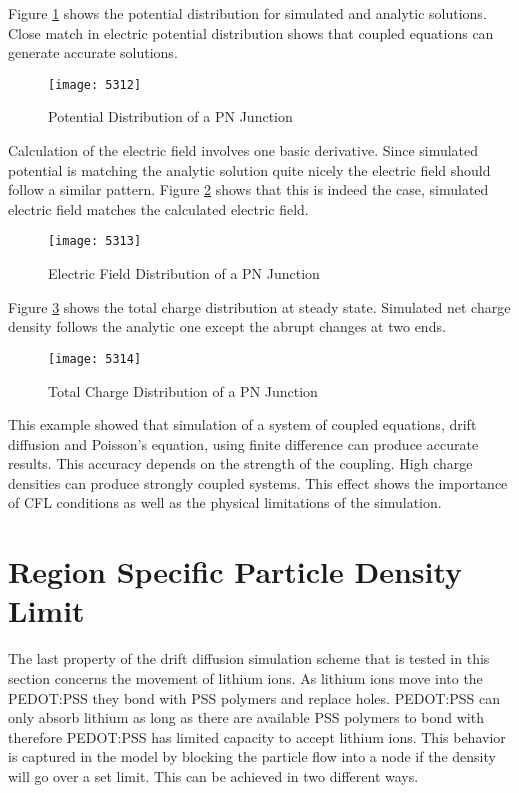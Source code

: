 \begin{doublespace}
 Figure \ref{pnpot} shows the potential distribution for simulated and analytic solutions. Close match in electric potential distribution shows that coupled equations can generate accurate solutions.
 
\begin{figure}[!htp]
\centering
\texttt{[image: 5312]}
\caption{Potential Distribution of a PN Junction} 
\label{pnpot}
\end{figure}

Calculation of the electric field involves one basic derivative. Since simulated potential is matching the analytic solution quite nicely the electric field should follow a similar pattern. Figure \ref{pnefield} shows that this is indeed the case, simulated electric field matches the calculated electric field.
\begin{figure}[!htp]
\centering
\texttt{[image: 5313]}
\caption{Electric Field Distribution of a PN Junction} 
\label{pnefield}
\end{figure}

Figure \ref{pncd} shows the total charge distribution at steady state. Simulated net charge density follows the analytic one except the abrupt changes at two ends. 
\begin{figure}
\centering
\texttt{[image: 5314]}
\caption{Total Charge Distribution of a PN Junction} 
\label{pncd}
\end{figure}

This example showed that simulation of a system of coupled equations, drift diffusion and Poisson's equation, using finite difference can produce accurate results. This accuracy depends on the strength of the coupling. High charge densities can produce strongly coupled systems. This effect shows the importance of CFL conditions as well as the physical limitations of the simulation.


\clearpage
\section{Region Specific Particle Density Limit}

The last property of the drift diffusion simulation scheme that is tested in this section concerns the movement of lithium ions. As lithium ions move into the PEDOT:PSS they bond with PSS polymers and replace holes. PEDOT:PSS can only absorb lithium as long as there are available PSS polymers to bond with therefore PEDOT:PSS has limited capacity to accept lithium ions. This behavior is captured in the model by blocking the particle flow into a node if the density will go over a set limit. This can be achieved in two different ways. 


\end{doublespace}
